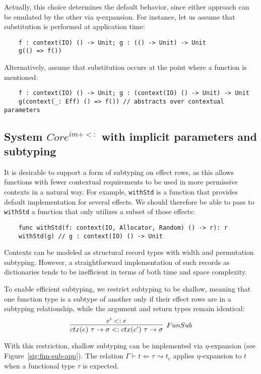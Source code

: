 \documentclass[acmsmall,review,screen]{acmart}
\newcommand{\ctx}[1]{ctx(#1)~}
\newcommand{\step}{\rightsquigarrow}
\begin{document}
Actually, this choice determines the default behavior, since either approach can be emulated by the other via $\eta$-expansion.
For instance, let us assume that substitution is performed at application time:
\begin{verbatim}
    f : context(IO) () -> Unit; g : (() -> Unit) -> Unit
    g(() => f())
\end{verbatim}
Alternatively, assume that substitution occurs at the point where a function is mentioned:
\begin{verbatim}
    f : context(IO) () -> Unit; g : (context(IO) () -> Unit) -> Unit
    g(context(_: Eff) () => f()) // abstracts over contextual parameters
\end{verbatim}


\subsection{System $Core^{im+<:}$ with implicit parameters and subtyping} \label{subsec:im-sub}

It is desirable to support a form of subtyping on effect rows, as this allows functions with fewer contextual requirements to be used in more permissive contexts in a natural way.
For example, \texttt{withStd} is a function that provides default implementation for several effects.
We should therefore be able to pass to \texttt{withStd} a function that only utilizes a subset of those effects:
\begin{verbatim}
    func withStd(f: context(IO, Allocator, Random) () -> r): r
    withStd(g) // g : context(IO) () -> Unit
\end{verbatim}

Contexts can be modeled as structural record types with width and permutation subtyping.
However, a straightforward implementation of such records as dictionaries tends to be inefficient in terms of both time and space complexity.

To enable efficient subtyping, we restrict subtyping to be shallow, meaning that one function type is a subtype of another only if their effect rows are in a subtyping relationship, while the argument and return types remain identical:
\[
    \infer[FunSub]{\ctx{e} \tau \to \sigma <: \ctx{e'} \tau\to\sigma}{e' <: e}
\]

With this restriction, shallow subtyping can be implemented via $\eta$-expansion (see Figure~\ref{sig:fim-sub-app}).
The relation $\Gamma\vdash t\Leftarrow \tau \step t_c$ applies $\eta$-expansion to $t$ when a functional type $\tau$ is expected.
\end{document}
